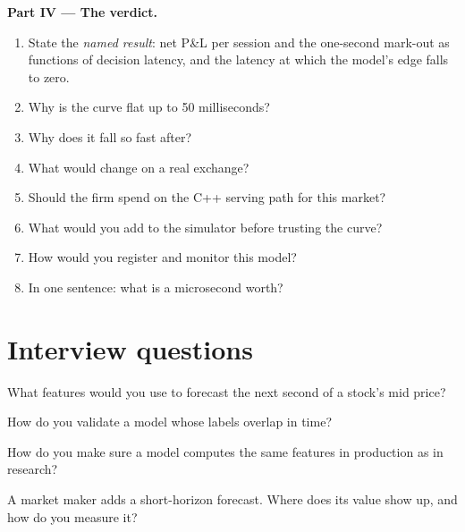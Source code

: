 \begin{problem}
\medskip\noindent\textbf{Part IV --- The verdict.}
\begin{enumerate}[resume]
\item State the \emph{named result}: net P\&L per session and the one-second mark-out as functions of decision latency, and the
latency at which the model's edge falls to zero.
\item Why is the curve flat up to 50 milliseconds?
\item Why does it fall so fast after?
\item What would change on a real exchange?
\item Should the firm spend on the C++ serving path for this market?
\item What would you add to the simulator before trusting the curve?
\item How would you register and monitor this model?
\item In one sentence: what is a microsecond worth?
\end{enumerate}
\end{problem}

\section{Interview questions}

\begin{interviewq}\label{iq:ml:build-an-order-book-model-end-to-end:1}
What features would you use to forecast the next second of a stock's mid price?
\end{interviewq}

\begin{interviewq}\label{iq:ml:build-an-order-book-model-end-to-end:2}
How do you validate a model whose labels overlap in time?
\end{interviewq}

\begin{interviewq}\label{iq:ml:build-an-order-book-model-end-to-end:3}
How do you make sure a model computes the same features in production as in research?
\end{interviewq}

\begin{interviewq}\label{iq:ml:build-an-order-book-model-end-to-end:4}
A market maker adds a short-horizon forecast. Where does its value show up, and how do you measure it?
\end{interviewq}

